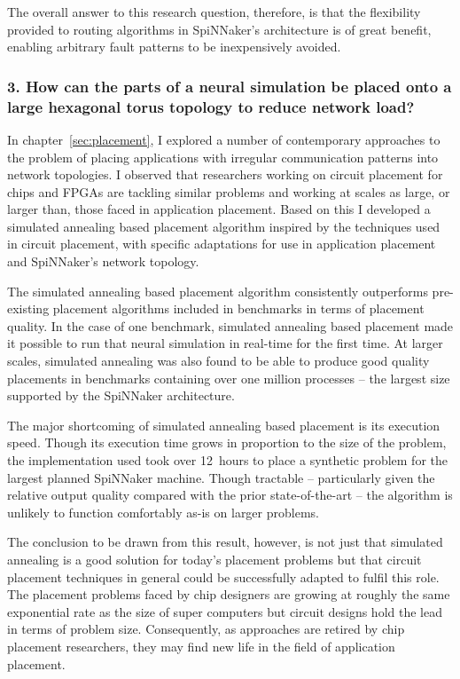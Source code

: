 		The overall answer to this research question, therefore, is that the
		flexibility provided to routing algorithms in SpiNNaker's architecture is
		of great benefit, enabling arbitrary fault patterns to be inexpensively
		avoided.
		
		\subsubsection{3. How can the parts of a neural simulation be placed onto a
		large hexagonal torus topology to reduce network load?}
		
		In chapter~\ref{sec:placement}, I explored a number of contemporary
		approaches to the problem of placing applications with irregular
		communication patterns into network topologies. I observed that researchers
		working on circuit placement for chips and FPGAs are tackling similar
		problems and working at scales as large, or larger than, those faced in
		application placement. Based on this I developed a
		simulated annealing based placement algorithm inspired by the techniques
		used in circuit placement, with specific adaptations for use in application
		placement and SpiNNaker's network topology.
		
		The simulated annealing based placement algorithm consistently outperforms
		pre-existing placement algorithms included in benchmarks in terms of
		placement quality.  In the case of one benchmark, simulated annealing based
		placement made it possible to run that neural simulation in real-time for
		the first time.  At larger scales, simulated annealing was also found to be
		able to produce good quality placements in benchmarks containing over one
		million processes -- the largest size supported by the SpiNNaker
		architecture.
		
		The major shortcoming of simulated annealing based placement is its
		execution speed. Though its execution time grows in proportion to the size
		of the problem, the implementation used took over 12~hours to place a
		synthetic problem for the largest planned SpiNNaker machine. Though
		tractable -- particularly given the relative output quality compared with
		the prior state-of-the-art -- the algorithm is unlikely to function
		comfortably as-is on larger problems.
		
		The conclusion to be drawn from this result, however, is not just that
		simulated annealing is a good solution for today's placement problems but
		that circuit placement techniques in general could be successfully adapted
		to fulfil this role. The placement problems faced by chip designers are
		growing at roughly the same exponential rate as the size of super computers
		but circuit designs hold the lead in terms of problem size. Consequently,
		as approaches are retired by chip placement researchers, they may find new
		life in the field of application placement.
		
